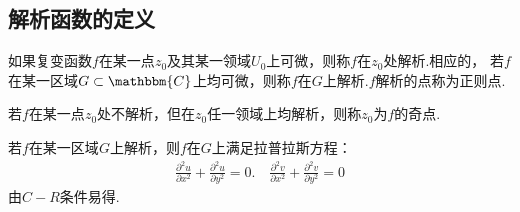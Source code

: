 \documentclass[lang=cn, titlestyle=display, scheme=chinese]{elegantbook}
\begin{document}
            \subsection{解析函数的定义}
                \begin{definition}[解析函数]\label{def:analytic_function}
                    如果复变函数$f$在某一点$z_0$及其某一领域$U_0$上可微，则称$f$在$z_0$处解析.相应的，
                    若$f$在某一区域$G \subset \mathbbm{C}$上均可微，则称$f$在$G$上解析.$f$解析的点称为正则点.
                \end{definition}
                \begin{definition}[奇点]\label{def:singular_point}
                    若$f$在某一点$z_0$处不解析，但在$z_0$任一领域上均解析，则称$z_0$为$f$的奇点.
                \end{definition}
                \begin{theorem}[Laplace 方程]\label{the:Laplace_equation}
                    若$f$在某一区域$G$上解析，则$f$在$G$上满足拉普拉斯方程：
                    \begin{align*}
                        \frac{\partial^2 u}{\partial x^2} + \frac{\partial^2 u}{\partial y^2} = 0. \quad \frac{\partial^2 v}{\partial x^2} + \frac{\partial^2 v}{\partial y^2} = 0
                    \end{align*}
                    由$C-R$条件易得.
                \end{theorem}
\end{document}
